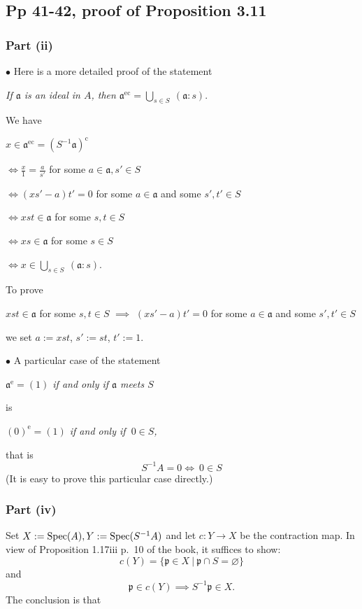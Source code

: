 \documentclass[parskip=half,fontsize=12pt]{scrartcl}%
\newcommand{\oo}{\operatorname}\newcommand{\ooo}{\operatorname*}
\newcommand{\mf}{\mathfrak}
\newcommand{\aaa}{\mf a}
\newcommand{\ppp}{\mf p}
\newcommand{\bu}{\bullet}
\newcommand{\ds}{\displaystyle}
\begin{document}
\subsection{Pp 41-42, proof of Proposition 3.11}%

\subsubsection{Part (ii)}

$\bu $ Here is a more detailed proof of the statement 

\emph{If $\aaa$ is an ideal in $A$, then $\aaa^{\oo{ec}}=\bigcup_{s\in S}\ (\aaa:s)$}.

We have 

$x\in\aaa^{\oo{ec}}=(S^{-1}\aaa)^{\oo c}$

$\ds\iff\frac{x}{1}=\frac{a}{s'}$ for some $a\in\aaa,s'\in S$ 

$\iff(xs'-a)t'=0$ for some $a\in\aaa$ and some $s',t'\in S$ 

$\iff xst\in\aaa$ for some $s,t\in S$

$\iff xs\in\aaa$ for some $s\in S$

$\iff x\in\bigcup_{s\in S}\ (\aaa:s)$.

To prove 

$xst\in\aaa$ for some $s,t\in S$ $\implies$ $(xs'-a)t'=0$ for some $a\in\aaa$ and some $s',t'\in S$

we set $a:=xst$, $s':=st$, $t':=1$.%

$\bu$ A particular case of the statement 

\emph{$\aaa^{\oo e}=(1)$ if and only if $\aaa$ meets $S$}

is 

\emph{$(0)^{\oo e}=(1)$ if and only if $\ 0\in S$,}

that is 
\begin{equation}\label{s-1a}
S^{-1}A=0\iff\ 0\in S
\end{equation}
(It is easy to prove this particular case directly.)

\subsubsection{Part (iv)}\label{prcor}%

Set $X:=\operatorname{Spec}(A),Y:=\operatorname{Spec}(S^{-1}A)$ and let $c:Y\to X$ be the contraction map. In view of Proposition 1.17iii p.~10 of the book, it suffices to show:
$$
c(Y)=\{\ppp\in X\ |\ \ppp\cap S=\varnothing\}
$$ 
and 
$$
\ppp\in c(Y)\implies S^{-1}\ppp\in X.
$$ 
The conclusion is that 
\end{document}
